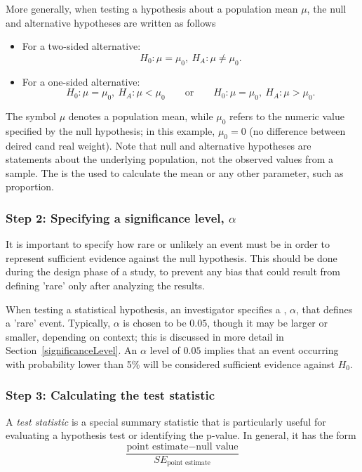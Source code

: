More generally, when testing a hypothesis about a population mean $\mu$, the null and alternative hypotheses are written as follows
\begin{itemize}
\setlength{\itemsep}{0mm}
  \item For a two-sided alternative:
    \[H_0: \mu = \mu_0, \ H_A: \mu \neq \mu_0.\]    
  \item For a one-sided alternative:
    \[H_0: \mu = \mu_0, \ H_A: \mu < \mu_0
      \qquad\text{or}\qquad
      H_0: \mu = \mu_0, \  H_A: \mu > \mu_0.\]
\end{itemize}
The symbol $\mu$ denotes a population mean, while $\mu_0$ refers to the numeric value specified by the null hypothesis; in this example, $\mu_0 = 0$ (no difference between deired cand real weight). Note that null and alternative hypotheses are statements about the underlying population, not the observed values from a sample.
The  is the used to calculate the mean or any other parameter, such as proportion.

\subsubsection{Step 2: Specifying a significance level, $\alpha$}

It is important to specify how rare or unlikely an event must be in order to represent sufficient evidence against the null hypothesis. This should be done during the design phase of a study, to prevent any bias that could result from defining 'rare' only after analyzing the results. 

When testing a statistical hypothesis, an investigator specifies a , $\alpha$, that defines a 'rare' event. Typically, $\alpha$ is chosen to be $0.05$, though it may be larger or smaller, depending on context; this is discussed in more detail in Section~\ref{significanceLevel}. An $\alpha$ level of $0.05$ implies that an event occurring with probability lower than 5\% will be considered sufficient evidence against $H_0$.


\subsubsection{Step 3: Calculating the test statistic}
A \emph{test statistic} is a special summary statistic that is particularly useful for evaluating a hypothesis test or identifying the p-value. In general, it has the form 
$$  \frac{\text{point estimate}- \text{null value}}{SE_{\text{point estimate}}}$$


